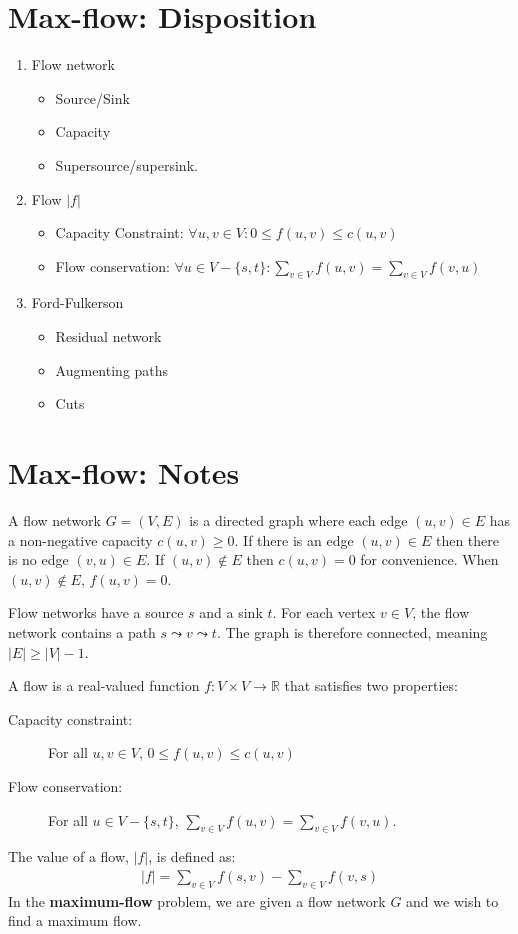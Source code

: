 \section{Max-flow: Disposition}
\begin{enumerate}
	\item Flow network
	\begin{itemize}
		\item Source/Sink
		\item Capacity
		\item Supersource/supersink.
	\end{itemize}
	\item Flow $|f|$
	\begin{itemize}
		\item Capacity Constraint: $\forall u,v\in V: 0 \leq f(u,v) \leq c(u,v)$
		\item Flow conservation: $\forall u\in V - \{s,t\}:
			\sum_{v\in V} f(u,v) = \sum_{v\in V} f(v,u)$
	\end{itemize}
	\item Ford-Fulkerson
	\begin{itemize}
		\item Residual network
		\item Augmenting paths
		\item Cuts
	\end{itemize}
\end{enumerate}
\section{Max-flow: Notes}
A flow network $G = (V,E)$ is a directed graph where each edge $(u,v) \in E$ has
a non-negative capacity $c(u,v) \geq 0$. If there is an edge $(u,v) \in E$ then
there is no edge $(v,u) \in E$. If $(u,v) \notin E$ then $c(u,v) = 0$ for convenience.
When $(u,v) \notin E$, $f(u,v) = 0$.

Flow networks have a source $s$ and a sink $t$. For each vertex $v \in V$, the flow
network contains a path $s \leadsto v \leadsto t$. The graph is therefore connected, meaning
$|E| \geq |V| - 1$.

A flow is a real-valued function $f : V \times V \rightarrow \mathbb{R}$ that satisfies
two properties:
\begin{description}
	\item[Capacity constraint:] For all $u,v \in V$, $0 \leq f(u,v) \leq c(u,v)$

	\item[Flow conservation:] For all $u \in V - \{s,t\}$, 
	$\sum_{v \in V} f(u,v) = \sum_{v \in V} f(v,u)$.
\end{description}
The value of a flow, $|f|$, is defined as:
\begin{align*}
	|f| = \sum_{v \in V} f(s,v) - \sum_{v \in V} f(v,s)
\end{align*}
In the \textbf{maximum-flow} problem, we are given a flow network $G$ and we wish to find
a maximum flow.

